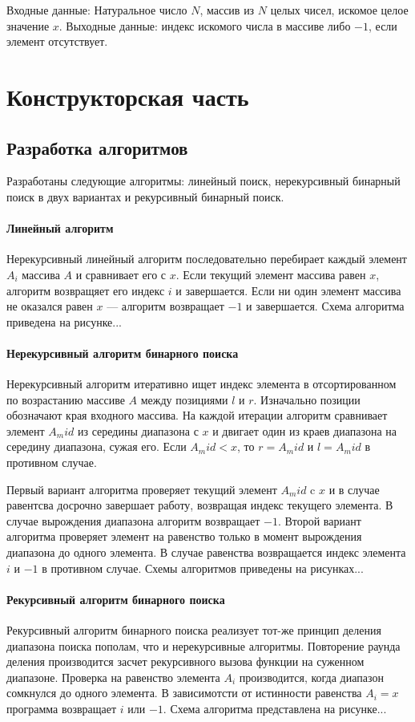 \documentclass{bmstu}
\begin{document}
Входные данные: Натуральное число $N$, массив из $N$ целых чисел,
искомое целое значение $x$. Выходные данные: индекс искомого числа в массиве
либо $-1$, если элемент отсутствует.

\chapter{Конструкторская часть}

\section{Разработка алгоритмов}
Разработаны следующие алгоритмы: линейный поиск, нерекурсивный
бинарный поиск в двух вариантах и рекурсивный бинарный поиск.

\subsubsection{Линейный алгоритм}
Нерекурсивный линейный алгоритм последовательно перебирает каждый элемент
$A_i$ массива $A$ и сравнивает его с $x$. Если текущий элемент массива равен $x$,
алгоритм возвращяет его индекс $i$ и завершается. Если ни один элемент массива
не оказался равен $x$ --- алгоритм возвращает $-1$ и завершается. Схема
алгоритма приведена на рисунке...

\subsubsection{Нерекурсивный алгоритм бинарного поиска}
Нерекурсивный алгоритм итеративно ищет индекс элемента в отсортированном
по возрастанию массиве $A$ между позициями $l$ и $r$. Изначально позиции обозначают
края входного массива. На каждой итерации алгоритм сравнивает элемент $A_mid$ из середины диапазона с
$x$ и двигает один из краев диапазона на середину диапазона, сужая его. Если
$A_mid < x$, то $r = A_mid$ и $l = A_mid$ в противном случае.

Первый вариант алгоритма проверяет текущий элемент $A_mid$ c $x$ и в случае равентсва
досрочно завершает работу, возвращая индекс текущего элемента. В случае
вырождения диапазона алгоритм возвращает $-1$. Второй вариант алгоритма
проверяет элемент на равенство только в момент вырождения диапазона до одного
элемента. В случае равенства возвращается индекс элемента $i$ и $-1$ в противном
случае. Схемы алгоритмов приведены на рисунках...

\subsubsection{Рекурсивный алгоритм бинарного поиска}
Рекурсивный алгоритм бинарного поиска реализует тот-же принцип деления диапазона
поиска пополам, что и нерекурсивные алгоритмы. Повторение раунда деления
производится засчет рекурсивного вызова функции на суженном диапазоне. Проверка
на равенство элемента $A_i$ производится, когда диапазон сомкнулся до одного
элемента. В зависимотсти от истинности равенства $A_i = x$ программа возвращает
$i$ или $-1$. Схема алгоритма представлена на рисунке...
\end{document}

